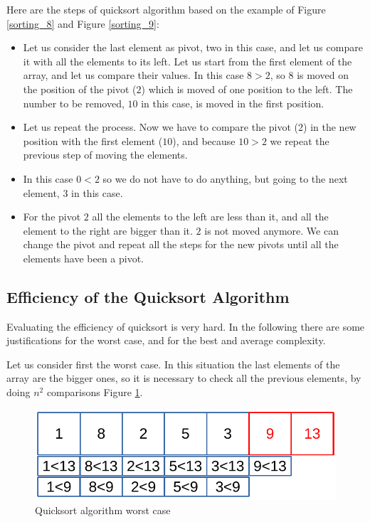 Here are the steps of quicksort algorithm based on the example of Figure \ref{sorting_8} and Figure \ref{sorting_9}:
\begin{itemize}
\item[1] Let us consider the last element as pivot, two in this case, and let us compare it with all the elements to its left. Let us start from the first element of the array, and let us compare their values. In this case \(8 > 2\), so \(8\) is moved on the position of the pivot (\(2\)) which is moved of one position to the left. The number to be removed, \(10\) in this case, is moved in the first position.
\item[2] Let us repeat the process. Now we have to compare the pivot (\(2\)) in the new position with the first element (\(10\)), and because \(10>2\) we repeat the previous step of moving the elements.
\item[3] In this case \(0<2\) so we do not have to do anything, but going to the next element, \(3\) in this case.
\item[4] For the pivot \(2\) all the elements to the left are less than it, and all the element to the right are bigger than it. \(2\) is not moved anymore. We can change the pivot and repeat all the steps for the new pivots until all the elements have been a pivot.
\end{itemize}

\subsection{Efficiency of the Quicksort Algorithm}
Evaluating the efficiency of quicksort is very hard. In the following there are some justifications for the worst case, and for the best and average complexity.

Let us consider first the worst case. In this situation the last elements of the array are the bigger ones, so it is necessary to check all the previous elements, by doing \(n^{2}\) comparisons Figure \ref{sorting_10}.

\begin{figure}[H]
	\begin{center}
		\includegraphics[scale=.6]{chapters/searchandsorting/images/sorting_10.pdf}
		\caption[Quicksort algorithm worst case]{Quicksort algorithm worst case}
		\label{sorting_10}
	\end{center}
\end{figure}

